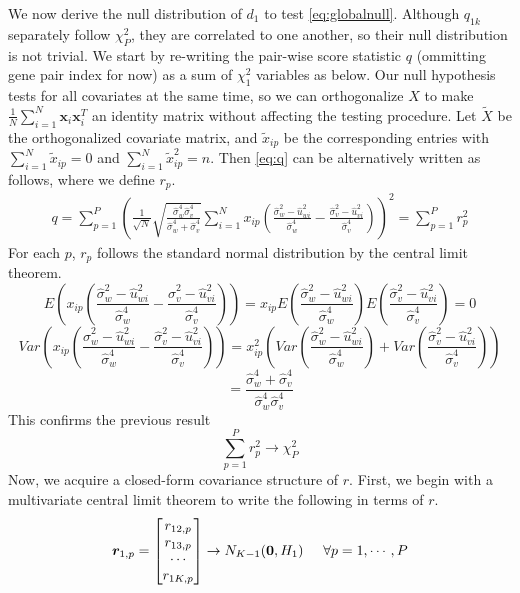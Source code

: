 \documentclass[aoas,preprint]{imsart}
\numberwithin{equation}{section}
\theoremstyle{plain}
\begin{document}
We now derive the null distribution of $d_1$ to test \ref{eq:globalnull}. Although ${q}_{1k}$ separately follow $\chi_{P}^2$, they are correlated to one another, so their null distribution is not trivial. We start by re-writing the pair-wise score statistic $q$ (ommitting gene pair index for now) as a sum of $\chi_1^2$ variables as below. Our null hypothesis tests for all covariates at the same time, so we can orthogonalize $X$ to make $\frac{1}{N} \sum_{i=1}^{N} \bm{x}_i \bm{x}_i^T$ an identity matrix without affecting the testing procedure. Let $\tilde{X}$ be the orthogonalized covariate matrix, and $\tilde{x}_{ip}$ be the corresponding entries with $\sum_{i=1}^{N}\tilde{x}_{ip} = 0$ and $\sum_{i=1}^{N} \tilde{x}_{ip}^2  = n$. Then \ref{eq:q} can be alternatively written as follows, where we define $r_{p}.$
\begin{align}
q = \sum_{p=1}^{P}
 \left(\frac{1}{\sqrt{N}}
 \sqrt{\frac{\hat{\sigma}_w^4 \hat{\sigma}_v^4}{\hat{\sigma}_w^4 + \hat{\sigma}_v^4}}
 \sum_{i=1}^{N} x_{ip} \left( \frac{\hat{\sigma}_w^2 - \hat{u}_{wi}^2}{\hat{\sigma}_w^4}
 - \frac{\hat{\sigma}_v^2 - \hat{u}_{vi}^2}{\hat{\sigma}_v^4}
 \right)
\right)^2 = \sum_{p=1}^{P}r_p^2
\label{r}
\end{align}
For each $p$, $r_p$ follows the standard normal distribution by the central limit theorem. 
$$E\left(x_{ip}\left( \frac{\hat{\sigma}_w^2 - \hat{u}_{wi}^2}{\hat{\sigma}_w^4}
 - \frac{\hat{\sigma}_v^2 - \hat{u}_{vi}^2}{\hat{\sigma}_v^4}
 \right)\right) = x_{ip} E\left( \frac{\hat{\sigma}_w^2 - \hat{u}_{wi}^2}{\hat{\sigma}_w^4} \right) E\left( \frac{\hat{\sigma}_v^2 - \hat{u}_{vi}^2}{\hat{\sigma}_v^4}
 \right) = 0$$
$$Var\left(x_{ip}\left( \frac{\hat{\sigma}_w^2 - \hat{u}_{wi}^2}{\hat{\sigma}_w^4}
 - \frac{\hat{\sigma}_v^2 - \hat{u}_{vi}^2}{\hat{\sigma}_v^4}
 \right)\right) = 
 x_{ip}^2 \left( Var\left( \frac{\hat{\sigma}_w^2 - \hat{u}_{wi}^2}{\hat{\sigma}_w^4} \right)  + Var\left( \frac{\hat{\sigma}_v^2 - \hat{u}_{vi}^2}{\hat{\sigma}_v^4}
 \right)\right)
 $$
 $$ = \frac{\hat{\sigma}_w^4 + \hat{\sigma}_v^4}{\hat{\sigma}_w^4 \hat{\sigma}_v^4}$$
This confirms the previous result
$$\sum_{p=1}^{P} r_p^2 \rightarrow \chi_P^2$$
 Now, we acquire a closed-form covariance structure of $r$. First, we begin with a multivariate central limit theorem to write the following in terms of $r$.
\begin{equation}
\bm{r}_{1,p} = \begin{bmatrix}
r_{12,p} \\ r_{13, p} \\ \cdots \\ r_{1K,p}
\end{bmatrix}  \rightarrow N_{K-1}(\bm{0}, H_1) \hspace{5mm} \forall p = 1, \cdots, P
\label{H}
\end{equation}
\end{document}
